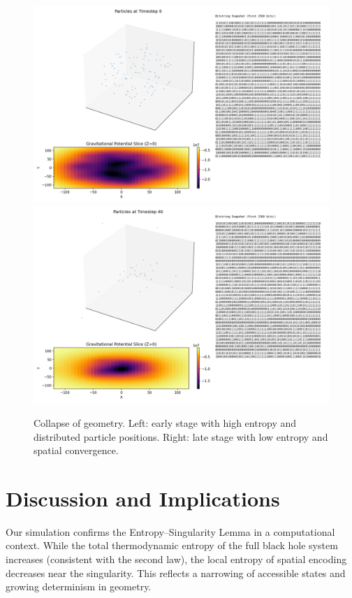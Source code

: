 \documentclass[11pt]{article}
\begin{document}
\begin{figure}[h!]
  \centering
  \includegraphics[width=\textwidth]{figures/collapse_0.png}
  \includegraphics[width=\textwidth]{figures/collapse_40.png}
  \caption{Collapse of geometry. Left: early stage with high entropy and distributed particle positions. Right: late stage with low entropy and spatial convergence.}
  \label{fig:spacetime_collapse}
\end{figure}

\section{Discussion and Implications}

Our simulation confirms the Entropy--Singularity Lemma in a computational context. While the total thermodynamic entropy of the full black hole system increases (consistent with the second law), the local entropy of spatial encoding decreases near the singularity. This reflects a narrowing of accessible states and growing determinism in geometry.
\end{document}
